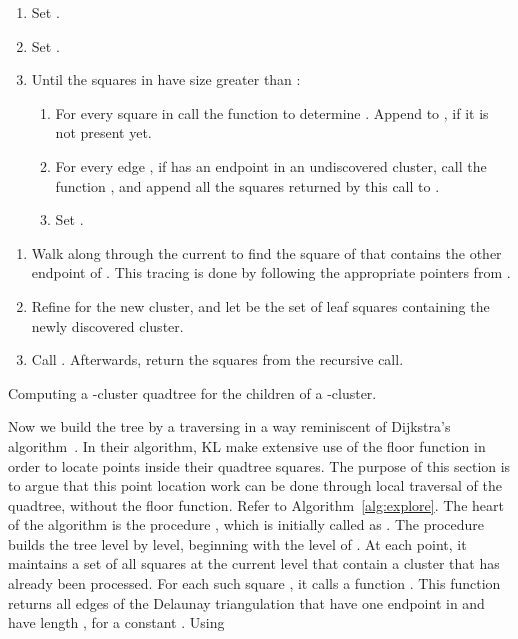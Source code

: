 \documentclass[11pt]{paper}
\begin{document}
\begin{algorithm}
  
  \begin{enumerate}
    \item\label{step:activeS} Set .
    \item Set .
    \item\label{step:loop}
          Until the squares in  have size greater than
          :
    \begin{enumerate}
      \item\label{step:activeLoop} For every square  in 
             call the function  
      to determine .  Append  to 
      , if it is not present yet.
      \item\label{step:starLoop} For every
            edge ,
            if  has an endpoint in an undiscovered cluster,
      call the function , and append
      all the squares returned by this call to .
      \item \label{step:newActive} Set .
    \end{enumerate}
  \end{enumerate}
 
  \begin{enumerate}
    \item   Walk along   through the current  to find the
            square  of  that contains the other endpoint
            of .
            This tracing is done by following the appropriate
             pointers from .
     \item \label{step:refine} Refine  for the new cluster, and
            let  be the set of leaf squares containing the newly
            discovered cluster.
      \item Call 
            .
      Afterwards, return the  squares from the recursive call.
  \end{enumerate}
  \caption{Computing a -cluster quadtree for the children of
    a -cluster.}
  \label{alg:explore}
\end{algorithm}

Now we build the tree  by a traversing  in
a way reminiscent of Dijkstra's algorithm~\cite{CormenLeRiSt09}.
In their algorithm, KL make extensive use of the floor function 
in order to locate points inside their quadtree squares. The 
purpose of this section is to argue that this point location work 
can be done through local traversal of the quadtree, without 
the floor function.
Refer to Algorithm~\ref{alg:explore}.
The heart of the algorithm is the procedure , 
which is initially called as
.
The procedure  builds the tree  level
by level, beginning with the level of .
At each point, it maintains
a set  of all squares at the current level that contain 
a cluster that has already been processed. For each such square ,
it calls a function . This function
returns all edges of the Delaunay triangulation that have one endpoint in
 and have length , for a constant . Using 
\end{document}
